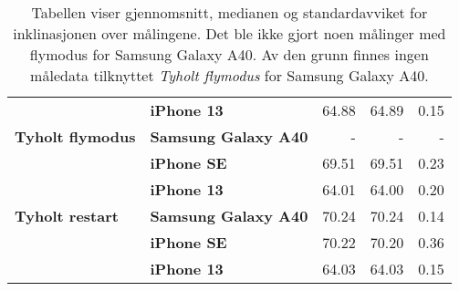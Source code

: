 \begin{table}[]
\begin{tabular}{llrrr}
                                            & \textbf{iPhone 13}                      & 64.88                                                                       & 64.89                                                                 & 0.15                                                                         \\
    \textbf{Tyholt flymodus}                & \textbf{Samsung Galaxy A40}                       & -                                                                           & -                                                                     & -                                                                            \\
                                            & \textbf{iPhone SE}                   & 69.51                                                                       & 69.51                                                                 & 0.23                                                                         \\
                                            & \textbf{iPhone 13}                      & 64.01                                                                       & 64.00                                                                 & 0.20                                                                         \\
    \rowcolor[HTML]{C0C0C0} 
    \textbf{Tyholt restart}                 & \textbf{Samsung Galaxy A40}                       & 70.24                                                                       & 70.24                                                                 & 0.14                                                                         \\
    \rowcolor[HTML]{C0C0C0} 
                                            & \textbf{iPhone SE}                   & 70.22                                                                       & 70.20                                                                 & 0.36                                                                         \\
    \rowcolor[HTML]{C0C0C0} 
                                            & \textbf{iPhone 13}                      & 64.03                                                                       & 64.03                                                                 & 0.15                                                                        
    \end{tabular}
    \caption{Tabellen viser gjennomsnitt, medianen og standardavviket for inklinasjonen over målingene. Det ble ikke gjort noen målinger med flymodus for Samsung Galaxy A40. Av den grunn finnes ingen måledata tilknyttet \textit{Tyholt flymodus} for Samsung Galaxy A40.}
\end{table}